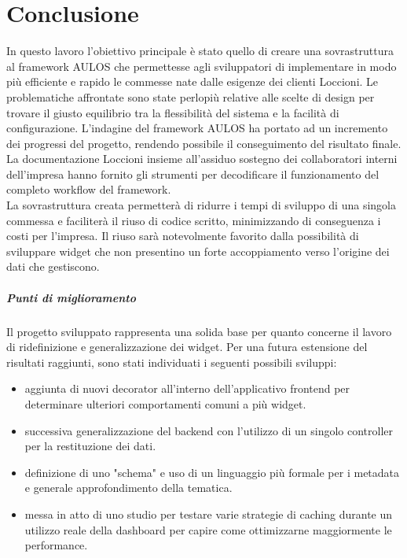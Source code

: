 \chapter{Conclusione}
\label{chap: conclusione}
In questo lavoro l'obiettivo principale è stato quello di creare una sovrastruttura al framework AULOS che permettesse agli sviluppatori di implementare in modo più efficiente e rapido le commesse nate dalle esigenze dei clienti Loccioni. Le problematiche affrontate sono state perlopiù relative alle scelte di design per trovare il giusto equilibrio tra la flessibilità del sistema e la facilità di configurazione. 
L'indagine del framework AULOS ha portato ad un incremento dei progressi del progetto, rendendo possibile il conseguimento del risultato finale. La documentazione Loccioni insieme all'assiduo sostegno dei collaboratori interni dell'impresa hanno fornito gli strumenti per decodificare il funzionamento del completo workflow del framework.
\\
La sovrastruttura creata permetterà di ridurre i tempi di sviluppo di una singola commessa e faciliterà il riuso di codice
scritto, minimizzando di conseguenza i costi per l'impresa. 
Il riuso sarà notevolmente favorito dalla possibilità di sviluppare widget che non presentino un forte accoppiamento verso l'origine dei dati che gestiscono.
\paragraph{Punti di miglioramento}
Il progetto sviluppato rappresenta una solida base per quanto concerne il lavoro di ridefinizione e generalizzazione dei widget. Per una futura estensione del risultati raggiunti, sono stati individuati i seguenti possibili sviluppi:
\begin{itemize}
    \item aggiunta di nuovi decorator all'interno dell'applicativo frontend per determinare ulteriori comportamenti comuni a più widget.
    \item successiva generalizzazione del backend con l'utilizzo di un singolo controller per la restituzione dei dati.
    \item definizione di uno "schema" e uso di un linguaggio più formale per i metadata e generale approfondimento della tematica.
    \item messa in atto di uno studio per testare varie strategie di caching durante un utilizzo reale della dashboard per capire come ottimizzarne maggiormente le performance.
\end{itemize}